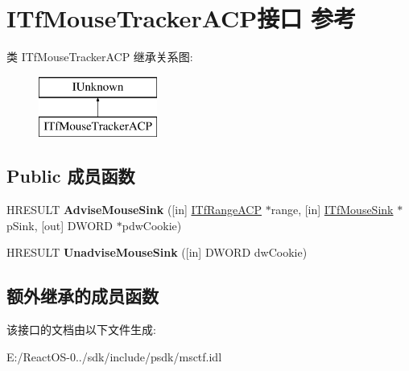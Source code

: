 \hypertarget{interface_i_tf_mouse_tracker_a_c_p}{}\section{I\+Tf\+Mouse\+Tracker\+A\+C\+P接口 参考}
\label{interface_i_tf_mouse_tracker_a_c_p}
类 I\+Tf\+Mouse\+Tracker\+A\+CP 继承关系图\+:\begin{figure}[H]
\begin{center}
\leavevmode
\includegraphics[height=2.000000cm]{interface_i_tf_mouse_tracker_a_c_p}
\end{center}
\end{figure}
\subsection*{Public 成员函数}
\begin{DoxyCompactItemize}
\item 
\mbox{\label{interface_i_tf_mouse_tracker_a_c_p_a67838571b37e522589968569e59ac3a1}} 
H\+R\+E\+S\+U\+LT {\bfseries Advise\+Mouse\+Sink} (\mbox{[}in\mbox{]} \hyperlink{interface_i_tf_range_a_c_p}{I\+Tf\+Range\+A\+CP} $\ast$range, \mbox{[}in\mbox{]} \hyperlink{interface_i_tf_mouse_sink}{I\+Tf\+Mouse\+Sink} $\ast$p\+Sink, \mbox{[}out\mbox{]} D\+W\+O\+RD $\ast$pdw\+Cookie)
\item 
\mbox{\label{interface_i_tf_mouse_tracker_a_c_p_a143bac1d6a91dd51c920bbd68f39313b}} 
H\+R\+E\+S\+U\+LT {\bfseries Unadvise\+Mouse\+Sink} (\mbox{[}in\mbox{]} D\+W\+O\+RD dw\+Cookie)
\end{DoxyCompactItemize}
\subsection*{额外继承的成员函数}


该接口的文档由以下文件生成\+:\begin{DoxyCompactItemize}
\item 
E\+:/\+React\+O\+S-\/0../sdk/include/psdk/msctf.\+idl\end{DoxyCompactItemize}

